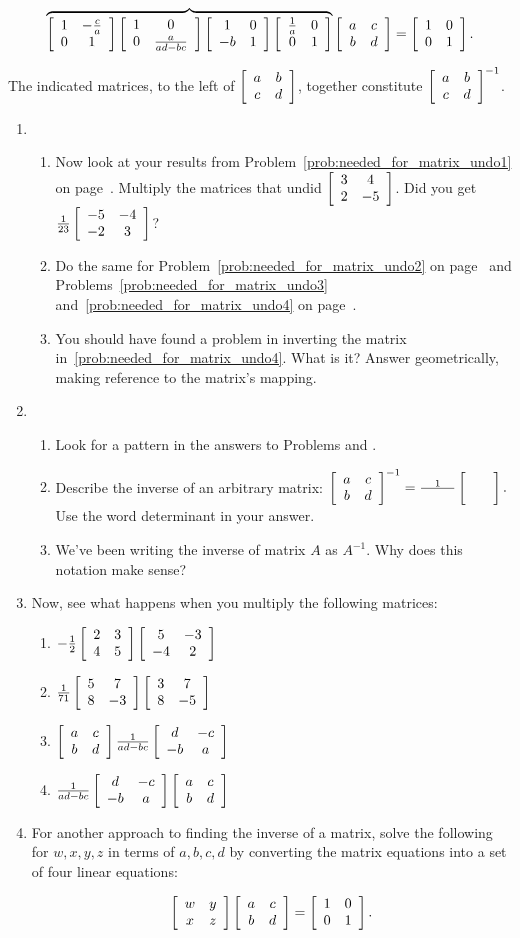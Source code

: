\documentclass[../gatm.tex]{subfiles}
\begin{document}
$$\overbrace{\left[\begin{array}{cc} 1 & -\frac{c}{a} \\ 0 & 1 \end{array}\right]\left[\begin{array}{cc} 1 & 0 \\ 0 & \frac{a}{ad-bc} \end{array}\right]\left[\begin{array}{cc} 1 & 0 \\ -b & 1 \end{array}\right]\left[\begin{array}{cc} \frac{1}{a} & 0 \\ 0 & 1 \end{array}\right]}\left[\begin{array}{cc} a & c \\ b & d \end{array}\right]=\left[\begin{array}{cc} 1 & 0 \\ 0 & 1 \end{array}\right].$$

The indicated matrices, to the left of $\left[\begin{array}{cc} a & b \\ c & d \end{array}\right]$, together constitute $\left[\begin{array}{cc} a & b \\ c & d \end{array}\right]^{-1}$.

\begin{enumerate}
\setcounter{enumi}{\value{problem_i}}
\item \begin{enumerate}
\item \label{prob:why_did_herreshoff_do_this1}Now look at your results from Problem~\ref{prob:needed_for_matrix_undo1} on page~\pageref{prob:needed_for_matrix_undo1}. Multiply the matrices that undid $\left[\begin{array}{cc} 3 & 4 \\ 2 & -5 \end{array}\right]$. Did you get $\frac{1}{23}\left[\begin{array}{cc} -5 & -4 \\ -2 & 3 \end{array}\right]$?
\item \label{prob:why_did_herreshoff_do_this2}Do the same for Problem~\ref{prob:needed_for_matrix_undo2} on page~\pageref{prob:needed_for_matrix_undo2} and Problems~\ref{prob:needed_for_matrix_undo3} and~\ref{prob:needed_for_matrix_undo4} on page~\pageref{prob:needed_for_matrix_undo3}.
\item You should have found a problem in inverting the matrix in~\ref{prob:needed_for_matrix_undo4}. What is it? Answer geometrically, making reference to the matrix's mapping.
\end{enumerate}
\item \begin{enumerate}
\item Look for a pattern in the answers to Problems \label{prob:why_did_herreshoff_do_this1} and \label{prob:why_did_herreshoff_do_this2}.
\item Describe the inverse of an arbitrary matrix: $\left[\begin{array}{cc} a & c \\ b & d \end{array}\right]^{-1}=\frac{1}{\phantom{000000}}\left[\begin{array}{cc}  &  \\  &  \end{array}\right].$ Use the word determinant in your answer.
\item We've been writing the inverse of matrix $A$ as $A^{-1}$. Why does this notation make sense?
\end{enumerate}
\item Now, see what happens when you multiply the following matrices:
\begin{multicols}{2}
\begin{enumerate}
\item $-\frac{1}{2}\left[\begin{array}{cc} 2 & 3 \\ 4 & 5 \end{array}\right]\left[\begin{array}{cc} 5 & -3 \\ -4 & 2 \end{array}\right]$
\item $\frac{1}{71}\left[\begin{array}{cc} 5 & 7 \\ 8 & -3 \end{array}\right]\left[\begin{array}{cc} 3 & 7 \\ 8 & -5 \end{array}\right]$
\item $\left[\begin{array}{cc} a & c \\ b & d \end{array}\right]\frac{1}{ad-bc}\left[\begin{array}{cc} d & -c \\ -b & a \end{array}\right]$
\item $\frac{1}{ad-bc}\left[\begin{array}{cc} d & -c \\ -b & a \end{array}\right]\left[\begin{array}{cc} a & c \\ b & d \end{array}\right]$
\end{enumerate}
\end{multicols}
\item For another approach to finding the inverse of a matrix, solve the following for $w,x,y,z$ in terms of $a,b,c,d$ by converting the matrix equations into a set of four linear equations:

$$\left[\begin{array}{cc} w & y \\ x & z \end{array}\right]\left[\begin{array}{cc} a & c \\ b & d \end{array}\right]=\left[\begin{array}{cc} 1 & 0 \\ 0 & 1 \end{array}\right].$$
\setcounter{problem_i}{\value{enumi}}
\end{enumerate}
\end{document}
